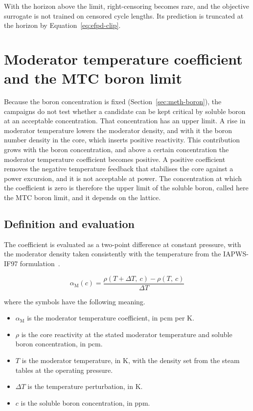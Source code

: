 \noindent With the horizon above the limit, right-censoring becomes
rare, and the objective surrogate is not trained on censored cycle
lengths. Its prediction is truncated at the horizon by
Equation~\eqref{eq:efpd-clip}.

\section{Moderator temperature coefficient and the MTC boron limit}
\label{sec:meth-mtc}

Because the boron concentration is fixed (Section~\ref{sec:meth-boron}),
the campaigns do not test whether a candidate can be kept critical by soluble boron at an
acceptable concentration. That concentration has an upper limit. A rise
in moderator temperature lowers the moderator density, and with it the
boron number density in the core, which inserts positive reactivity.
This contribution grows with the boron concentration, and above a
certain concentration the moderator temperature coefficient becomes
positive. A positive coefficient removes the negative temperature
feedback that stabilises the core against a power excursion, and it is
not acceptable at power. The concentration at which the coefficient is
zero is therefore the upper limit of the soluble boron, called here the
MTC boron limit, and it depends on the lattice.

\subsection{Definition and evaluation}
\label{sec:meth-mtc-def}

The coefficient is evaluated as a two-point difference at constant
pressure, with the moderator density taken consistently with the
temperature from the IAPWS-IF97 formulation~\cite{wagner_iapws_if97_2000}.

\begin{equation}
\alpha_\mathrm{M}(c) = \frac{\rho\!\left(T + \Delta T,\ c\right)
- \rho\!\left(T,\ c\right)}{\Delta T}
\label{eq:mtc}
\end{equation}

\noindent where the symbols have the following meaning.

\begin{itemize}
  \item $\alpha_\mathrm{M}$ is the moderator temperature coefficient, in
        pcm per K.
  \item $\rho$ is the core reactivity at the stated moderator temperature
        and soluble boron concentration, in pcm.
  \item $T$ is the moderator temperature, in K, with the density set from
        the steam tables at the operating pressure.
  \item $\Delta T$ is the temperature perturbation, in K.
  \item $c$ is the soluble boron concentration, in ppm.
\end{itemize}

